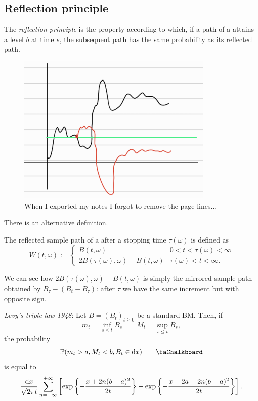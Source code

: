 \documentclass[12pt]{report}
\begin{document}
\subsection{Reflection principle}
The \emph{reflection principle} is the property according to which, if a path of a \bwm{} attains a level $b$ at time $s$, the subsequent path has the same probability as its reflected path.
\begin{figure}[h]
	\centering
	\includegraphics[width=0.4\linewidth]{img/screenshot030}
	\caption{When I exported my notes I forgot to remove the page lines...}
	\label{fig:screenshot030}
\end{figure}
There is an alternative definition.
\begin{definition}
	The reflected sample path of a \bwm{} after a stopping time $\tau(\omega)$ is defined as
	\begin{equation*}
		W(t,\omega):=\begin{cases}
			B(t,\omega)&0<t<\tau(\omega)<\infty\\
			2B(\tau(\omega),\omega)-B(t,\omega)&\tau(\omega)<t<\infty.
		\end{cases}
	\end{equation*}
\end{definition}
We can see how $	2B(\tau(\omega),\omega)-B(t,\omega)$ is simply the mirrored sample path obtained by $B_{\tau}-\left(B_{t}-B_{\tau}\right)$: after $\tau$ we have the same increment but with opposite sign.
\begin{theorem}
	\emph{Levy's triple law 1948}: Let $B={(B_{t})}_{t\geq0}$ be a standard BM. Then, if
	\begin{equation*}
		m_{t}=\inf_{s\leq t}B_{s}\qquad M_{t}=\sup_{s\leq t}B_{s},
	\end{equation*} the probability
	\begin{equation*}
		\pr(m_{t}>a,M_{t}<b,B_{t}\in\dx)\tag*{\faChalkboard}\label{chalk}
	\end{equation*}
	is equal to
	\begin{equation*}
		\frac{\mathop{}\!\mathrm{d} x}{\sqrt{2\pi t}}\sum_{n=-\infty}^{+\infty}\left[\exp\left\{-\frac{x+2n(b-a)^{2}}{2t}\right\}-\exp\left\{-\frac{x-2a-2n(b-a)^{2}}{2t}\right\}\right].
	\end{equation*}
\end{theorem} 
\end{document}
